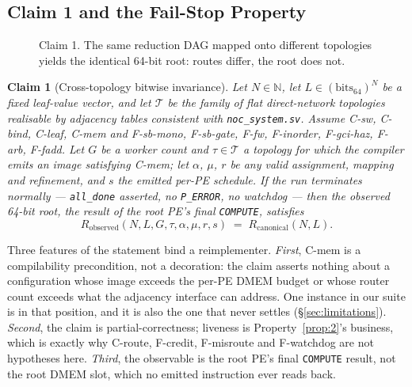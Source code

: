 \documentclass[journal,10pt]{IEEEtran}
\theoremstyle{plain}
\newtheorem{claim}{Claim}
\theoremstyle{definition}
\theoremstyle{remark}
\newcommand{\Rcan}{\ensuremath{R_{\mathrm{canonical}}}}
\newcommand{\sv}[1]{\texttt{#1}}
\newcommand{\T}{\ensuremath{\mathcal{T}}}
\newcommand{\asgn}{\ensuremath{\alpha}}
\newcommand{\map}{\ensuremath{\mu}}
\begin{document}
\subsection{Claim 1 and the Fail-Stop Property}\label{sec:abi-claim}

\begin{figure}[!t]\centering

\caption{Claim 1. The same reduction DAG mapped onto different topologies yields the identical 64-bit root: routes differ, the root does not.}\label{fig:claim1}
\end{figure}


\begin{claim}[Cross-topology bitwise invariance]\label{claim:1}
Let $N \in \mathbb{N}$, let $L \in (\mathrm{bits}_{64})^N$ be a fixed
leaf-value vector, and let $\T$ be the family of flat direct-network
topologies realisable by adjacency tables consistent with
\sv{noc\_system.sv}. Assume \textsf{C-sw}, \textsf{C-bind}, \textsf{C-leaf},
\textsf{C-mem} and \textsf{F-sb-mono}, \textsf{F-sb-gate}, \textsf{F-fw},
\textsf{F-inorder}, \textsf{F-gci-haz}, \textsf{F-arb}, \textsf{F-fadd}. Let
$G$ be a worker count and $\tau \in \T$ a topology for which the compiler
emits an image satisfying \textsf{C-mem}; let $\asgn$, $\map$, $r$ be any
valid assignment, mapping and refinement, and $s$ the emitted per-PE schedule.
If the run terminates normally --- \sv{all\_done} asserted, no
\texttt{P\_ERROR}, no watchdog --- then the observed 64-bit root, the result
of the root PE's final \texttt{COMPUTE}, satisfies
\begin{equation}
  R_\mathrm{observed}(N, L, G, \tau, \asgn, \map, r, s)
    \;=\; \Rcan(N, L).
\end{equation}
\end{claim}

Three features of the statement bind a reimplementer. \emph{First},
\textsf{C-mem} is a compilability precondition, not a decoration: the claim
asserts nothing about a configuration whose image exceeds the per-PE DMEM
budget or whose router count exceeds what the adjacency interface can address.
One instance in our suite is in that position, and it is also the one that
never settles (\S\ref{sec:limitations}). \emph{Second}, the claim is
partial-correctness; liveness is Property~\ref{prop:2}'s business, which is
exactly why \textsf{C-route}, \textsf{F-credit}, \textsf{F-misroute} and
\textsf{F-watchdog} are not hypotheses here. \emph{Third}, the observable is
the root PE's final \texttt{COMPUTE} result, not the root DMEM slot, which no
emitted instruction ever reads back.
\end{document}
